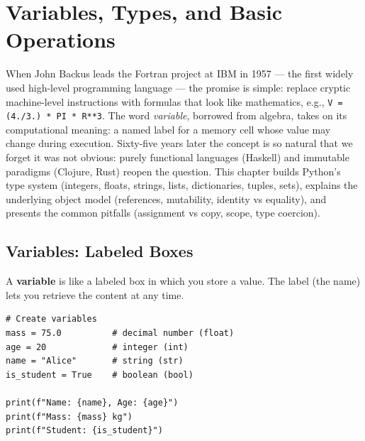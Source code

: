 \chapter{Variables, Types, and Basic Operations}
\label{ch:variables}

When John Backus leads the Fortran project at IBM in 1957 --- the first widely used high-level programming language --- the promise is simple: replace cryptic machine-level instructions with formulas that look like mathematics, e.g., \texttt{V = (4./3.) * PI * R**3}. The word \emph{variable}, borrowed from algebra, takes on its computational meaning: a named label for a memory cell whose value may change during execution. Sixty-five years later the concept is so natural that we forget it was not obvious: purely functional languages (Haskell) and immutable paradigms (Clojure, Rust) reopen the question. This chapter builds Python's type system (integers, floats, strings, lists, dictionaries, tuples, sets), explains the underlying object model (references, mutability, identity vs equality), and presents the common pitfalls (assignment vs copy, scope, type coercion).

\section{Variables: Labeled Boxes}

\begin{intuition}
A \textbf{variable} is like a labeled box in which you store a value. The label (the name) lets you retrieve the content at any time.
\end{intuition}

\begin{center}
\end{center}

\begin{codeblock}[title=\textbf{Python --- Creating variables}]
\begin{verbatim}
# Create variables
mass = 75.0          # decimal number (float)
age = 20             # integer (int)
name = "Alice"       # string (str)
is_student = True    # boolean (bool)

print(f"Name: {name}, Age: {age}")
print(f"Mass: {mass} kg")
print(f"Student: {is_student}")
\end{verbatim}
\end{codeblock}

